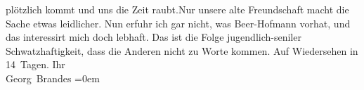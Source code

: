 \begin{ledgroupsized}[t]{13cm}
                    plötzlich kommt und uns die Zeit raubt.\hspace*{1.5em}Nur
                    unsere alte Freundschaft macht die Sache etwas leidlicher.\pend
           \pstart
           Nun erfuhr ich gar nicht, was Beer-Hofmann
                    vorhat, und das interessirt mich doch lebhaft. Das ist die Folge
                    jugendlich-seniler Schwatzhaftigkeit, dass die Anderen nicht zu Worte
                    kommen.\pend
           \pstart
           Auf Wiedersehen in 14 Tagen.\pend
           \pstart
           Ihr{\\[\baselineskip]}\spacefill\mbox{Georg Brandes}\pend
           \leftskip=0em{}\endnumbering{}\end{ledgroupsized}  \newcommand{\dateiname}{L01121}\newcommand{\titel}{Georg Brandes an Arthur Schnitzler, 17. 5. 1901}\newcommand{\editorInnen}{Martin Anton Müller und Gerd-Hermann Susen}
      